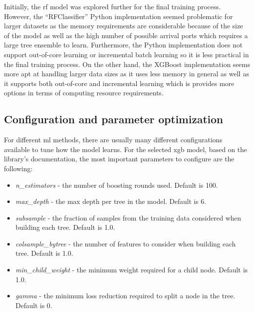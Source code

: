 Initially, the \acrshort{rf} model was explored further for the final training process. However, the ``RFClassifier'' Python implementation seemed problematic for larger datasets as the memory requirements are considerable because of the size of the model as well as the high number of possible arrival ports which requires a large tree ensemble to learn. Furthermore, the Python implementation does not support out-of-core learning or incremental batch learning so it is less practical in the final training process. On the other hand, the XGBoost implementation seems more apt at handling larger data sizes as it uses less memory in general as well as it supports both out-of-core and incremental learning which is provides more options in terms of computing resource requirements.

\subsection{Configuration and parameter optimization}

For different \acrshort{ml} methods, there are usually many different configurations available to tune how the model learns. For the selected \acrfull{xgb} model, based on the library's documentation, the most important parameters to configure are the following:

\begin{itemize}
    \item \textit{n\_estimators} - the number of boosting rounds used. Default is 100.
    \item \textit{max\_depth} - the max depth per tree in the model. Default is 6.
    \item \textit{subsample} - the fraction of samples from the training data considered when building each tree. Default is 1.0.
    \item \textit{colsample\_bytree} - the number of features to consider when building each tree. Default is 1.0.
    \item \textit{min\_child\_weight} - the minimum weight required for a child node. Default is 1.0.
    \item \textit{gamma} - the minimum loss reduction required to split a node in the tree. Default is 0.
\end{itemize}

